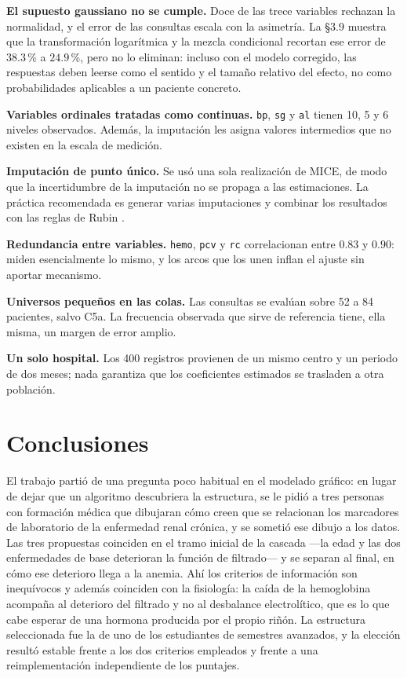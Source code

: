 \documentclass[11pt, a4paper]{article}
\begin{document}
\textbf{El supuesto gaussiano no se cumple.} Doce de las trece variables rechazan la normalidad, y
el error de las consultas escala con la asimetría. La \S3.9 muestra que la transformación
logarítmica y la mezcla condicional recortan ese error de $38.3$\,\% a $24.9$\,\%, pero no lo
eliminan: incluso con el modelo corregido, las respuestas deben leerse como el sentido y el tamaño
relativo del efecto, no como probabilidades aplicables a un paciente concreto.

\textbf{Variables ordinales tratadas como continuas.} \texttt{bp}, \texttt{sg} y \texttt{al} tienen
10, 5 y 6 niveles observados. Además, la imputación les asigna valores intermedios que no existen
en la escala de medición.

\textbf{Imputación de punto único.} Se usó una sola realización de MICE, de modo que la
incertidumbre de la imputación no se propaga a las estimaciones. La práctica recomendada es generar
varias imputaciones y combinar los resultados con las reglas de Rubin \cite{little2002}.

\textbf{Redundancia entre variables.} \texttt{hemo}, \texttt{pcv} y \texttt{rc} correlacionan entre
$0.83$ y $0.90$: miden esencialmente lo mismo, y los arcos que los unen inflan el ajuste sin
aportar mecanismo.

\textbf{Universos pequeños en las colas.} Las consultas se evalúan sobre 52 a 84 pacientes, salvo
C5a. La frecuencia observada que sirve de referencia tiene, ella misma, un margen de error amplio.

\textbf{Un solo hospital.} Los 400 registros provienen de un mismo centro y un periodo de dos
meses; nada garantiza que los coeficientes estimados se trasladen a otra población.

\section{Conclusiones}

El trabajo partió de una pregunta poco habitual en el modelado gráfico: en lugar de dejar que un
algoritmo descubriera la estructura, se le pidió a tres personas con formación médica que dibujaran
cómo creen que se relacionan los marcadores de laboratorio de la enfermedad renal crónica, y se
sometió ese dibujo a los datos. Las tres propuestas coinciden en el tramo inicial de la cascada
—la edad y las dos enfermedades de base deterioran la función de filtrado— y se separan al final,
en cómo ese deterioro llega a la anemia. Ahí los criterios de información son inequívocos y además
coinciden con la fisiología: la caída de la hemoglobina acompaña al deterioro del filtrado y no al
desbalance electrolítico, que es lo que cabe esperar de una hormona producida por el propio riñón.
La estructura seleccionada fue la de uno de los estudiantes de semestres avanzados, y la elección
resultó estable frente a los dos criterios empleados y frente a una reimplementación independiente
de los puntajes.
\end{document}
